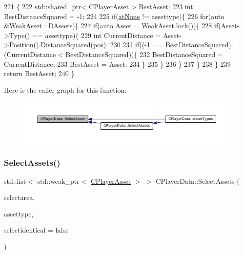 \begin{DoxyCode}
221                                                                                               \{
222     std::shared\_ptr< CPlayerAsset > BestAsset;
223     \textcolor{keywordtype}{int} BestDistanceSquared = -1;
224     
225     \textcolor{keywordflow}{if}(\hyperlink{GameDataTypes_8h_a5600d4fc433b83300308921974477feca82fb51718e2c00981a2d37bc6fe92593}{atNone} != assettype)\{
226         \textcolor{keywordflow}{for}(\textcolor{keyword}{auto} &WeakAsset : \hyperlink{classCPlayerData_a1d7dd355facf52db6242e3554373906c}{DAssets})\{
227             \textcolor{keywordflow}{if}(\textcolor{keyword}{auto} Asset = WeakAsset.lock())\{
228                 \textcolor{keywordflow}{if}(Asset->Type() == assettype)\{
229                     \textcolor{keywordtype}{int} CurrentDistance = Asset->Position().DistanceSquared(pos);
230                     
231                     \textcolor{keywordflow}{if}((-1 == BestDistanceSquared)||(CurrentDistance < BestDistanceSquared))\{
232                         BestDistanceSquared = CurrentDistance;
233                         BestAsset = Asset;
234                     \}
235                 \}
236             \}
237         \}
238     \}
239     \textcolor{keywordflow}{return} BestAsset;
240 \}
\end{DoxyCode}
Here is the caller graph for this function\+:
\nopagebreak
\begin{figure}[H]
\begin{center}
\leavevmode
\includegraphics[width=350pt]{classCPlayerData_a1c926b101513f871ec85e34ac3c83ec4_icgraph}
\end{center}
\end{figure}
\hypertarget{classCPlayerData_afb3303a53687383e4101d4de37391d84}{}\label{classCPlayerData_afb3303a53687383e4101d4de37391d84} 
\subsubsection{\texorpdfstring{Select\+Assets()}{SelectAssets()}}
{\footnotesize\ttfamily std\+::list$<$ std\+::weak\+\_\+ptr$<$ \hyperlink{classCPlayerAsset}{C\+Player\+Asset} $>$ $>$ C\+Player\+Data\+::\+Select\+Assets (\begin{DoxyParamCaption}\item[{const \hyperlink{structSRectangle}{S\+Rectangle} \&}]{selectarea,  }\item[{\hyperlink{GameDataTypes_8h_a5600d4fc433b83300308921974477fec}{E\+Asset\+Type}}]{assettype,  }\item[{bool}]{selectidentical = {\ttfamily false} }\end{DoxyParamCaption})}




